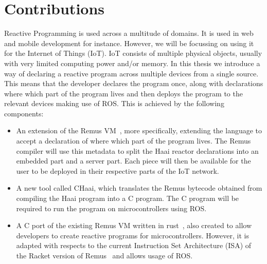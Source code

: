 \documentclass[a4paper]{book}
\begin{document}
\section{Contributions}
\label{sec:contributions}
Reactive Programming is used across a multitude of domains. It is used in web
and mobile development for instance. However, we will be focussing on using it
for the Internet of Things (IoT). IoT consists of multiple physical objects,
usually with very limited computing power and/or memory. In this thesis we
introduce a way of declaring a reactive program across multiple devices from a
single source. This means that the developer declares the program once, along
with declarations where which part of the program lives and then deploys the
program to the relevant devices making use of ROS.
This is achieved by the following components:
\begin{itemize}

	\item An extension of the Remus VM~\cite{oeyen2024virtual}, more
	      specifically, extending the language to accept a declaration of where
	      which part of the program lives. The Remus compiler will use this
	      metadata to split the Haai reactor declarations into an embedded part
	      and a server part. Each piece will then be available for the user to
	      be deployed in their respective parts of the IoT network.
	\item A new tool called CHaai, which translates the Remus bytecode
	      obtained from compiling the Haai program into a C program. The C
	      program will be required to run the program on microcontrollers using ROS.
	\item A C port of the existing Remus VM written in rust~\cite{descheemaeker2023compilation}, also created to allow developers to create reactive
	      programs for microcontrollers. However, it is adapted with respects to
	      the current Instruction Set Architecture (ISA) of the Racket version
	      of Remus~\cite{oeyen2024virtual} and allows usage of ROS.
\end{itemize}
\end{document}
